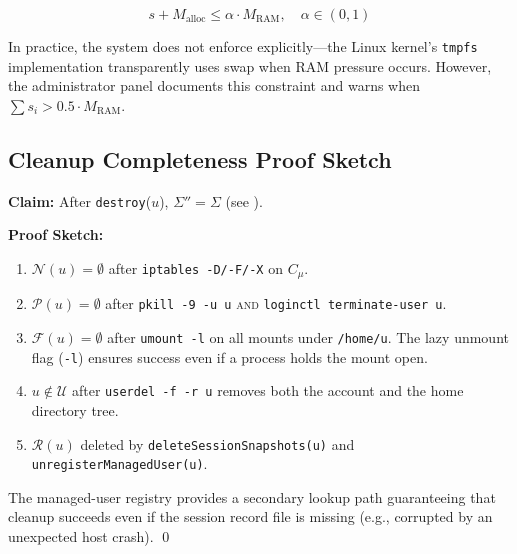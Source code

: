 \begin{equation}
    s + M_{\text{alloc}} \leq \alpha \cdot M_{\text{RAM}}, \quad \alpha \in (0, 1)
    \label{eq:ram_constraint}
\end{equation}

In practice, the system does not enforce  explicitly—the Linux kernel's \texttt{tmpfs} implementation transparently uses swap when RAM pressure occurs. However, the administrator panel documents this constraint and warns when $\sum s_i > 0.5 \cdot M_{\text{RAM}}$.

\subsection{Cleanup Completeness Proof Sketch}

\textbf{Claim:} After \texttt{destroy}($u$), $\Sigma'' = \Sigma$ (see ).

\textbf{Proof Sketch:}
\begin{enumerate}
    \item $\mathcal{N}(u) = \emptyset$ after \texttt{iptables -D/-F/-X} on $C_\mu$. \checkmark
    \item $\mathcal{P}(u) = \emptyset$ after \texttt{pkill -9 -u u} \textsc{and} \texttt{loginctl terminate-user u}. \checkmark
    \item $\mathcal{F}(u) = \emptyset$ after \texttt{umount -l} on all mounts under \texttt{/home/u}. The lazy unmount flag (\texttt{-l}) ensures success even if a process holds the mount open. \checkmark
    \item $u \notin \mathcal{U}$ after \texttt{userdel -f -r u} removes both the account and the home directory tree. \checkmark
    \item $\mathcal{R}(u)$ deleted by \texttt{deleteSessionSnapshots(u)} and \texttt{unregisterManagedUser(u)}. \checkmark
\end{enumerate}

The managed-user registry provides a secondary lookup path guaranteeing that cleanup succeeds even if the session record file is missing (e.g., corrupted by an unexpected host crash). \qed
